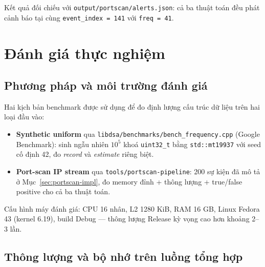 Kết quả đối chiếu với \texttt{output/portscan/alerts.json}: cả ba thuật toán đều phát cảnh báo tại cùng \texttt{event\_index = 141} với \texttt{freq = 41}.

\section{Đánh giá thực nghiệm}
\label{sec:eval}

\subsection{Phương pháp và môi trường đánh giá}

Hai kịch bản benchmark được sử dụng để đo định lượng cấu trúc dữ liệu trên hai loại đầu vào:

\begin{itemize}
  \item \textbf{Synthetic uniform} qua \texttt{libdsa/benchmarks/bench\_frequency.cpp} (Google Benchmark): sinh ngẫu nhiên $10^5$ khoá \texttt{uint32\_t} bằng \texttt{std::mt19937} với seed cố định 42, đo \textit{record} và \textit{estimate} riêng biệt.
  \item \textbf{Port-scan IP stream} qua \texttt{tools/portscan-pipeline}: 200 sự kiện đã mô tả ở Mục~\ref{sec:portscan-impl}, đo memory đỉnh + thông lượng + true/false positive cho cả ba thuật toán.
\end{itemize}

Cấu hình máy đánh giá: CPU 16 nhân, L2 1280 KiB, RAM 16 GB, Linux Fedora 43 (kernel 6.19), build Debug --- thông lượng Release kỳ vọng cao hơn khoảng 2--3 lần.

\subsection{Thông lượng và bộ nhớ trên luồng tổng hợp}

